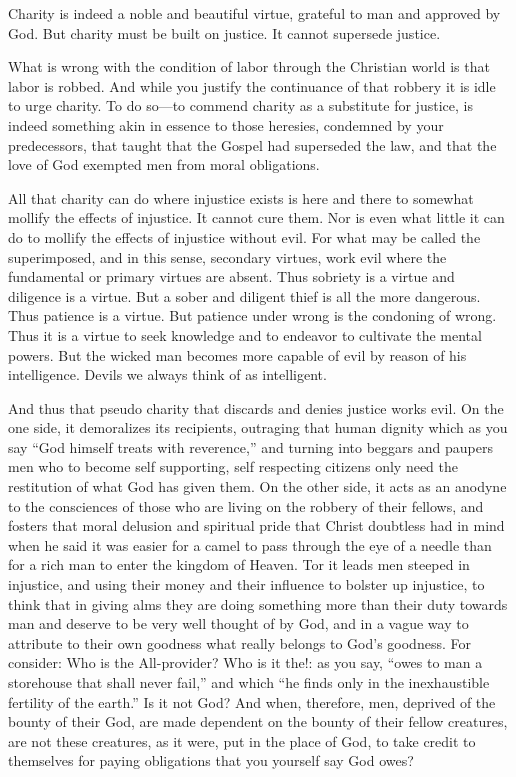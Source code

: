 \documentclass{book}
\begin{document}
Charity is indeed a noble and beautiful virtue, grateful to man and approved by God. But charity must be built on justice. It cannot supersede justice.

What is wrong with the condition of labor through the Christian world is that labor is robbed. And while you justify the continuance of that robbery it is idle to urge charity. To do so—to commend charity as a substitute for justice, is indeed something akin in essence to those heresies, condemned by your predecessors, that taught that the Gospel had superseded the law, and that the love of God exempted men from moral obligations.

All that charity can do where injustice exists is here and there to somewhat mollify the effects of injustice. It cannot cure them. Nor is even what little it can do to mollify the effects of injustice without evil. For what may be called the superimposed, and in this sense, secondary virtues, work evil where the fundamental or primary virtues are absent. Thus sobriety is a virtue and diligence is a virtue. But a sober and diligent thief is all the more dangerous. Thus patience is a virtue. But patience under wrong is the condoning of wrong. Thus it is a virtue to seek knowledge and to endeavor to cultivate the mental powers. But the wicked man becomes more capable of evil by reason of his intelligence. Devils we always think of as intelligent.

And thus that pseudo charity that discards and denies justice works evil. On the one side, it demoralizes its recipients, outraging that human dignity which as you say “God himself treats with reverence,” and turning into beggars and paupers men who to become self supporting, self respecting citizens only need the restitution of what God has given them. On the other side, it acts as an anodyne to the consciences of those who are living on the robbery of their fellows, and fosters that moral delusion and spiritual pride that Christ doubtless had in mind when he said it was easier for a camel to pass through the eye of a needle than for a rich man to enter the kingdom of Heaven. Tor it leads men steeped in injustice, and using their money and their influence to bolster up injustice, to think that in giving alms they are doing something more than their duty towards man and deserve to be very well thought of by God, and in a vague way to attribute to their own goodness what really belongs to God’s goodness. For consider: Who is the All-provider? Who is it the!: as you say, “owes to man a storehouse that shall never fail,” and which “he finds only in the inexhaustible fertility of the earth.” Is it not God? And when, therefore, men, deprived of the bounty of their God, are made dependent on the bounty of their fellow creatures, are not these creatures, as it were, put in the place of God, to take credit to themselves for paying obligations that you yourself say God owes?
\end{document}
